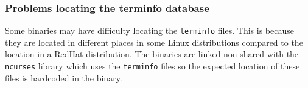 \documentclass[twoside,11pt]{article}
\renewcommand{\_}{\texttt{\symbol{95}}}
\begin{document}




\subsubsection{Problems locating the terminfo database}

Some binaries may have difficulty locating the \texttt{terminfo} files.
This is because they are located in different places in some Linux 
distributions compared to the location in a RedHat distribution.  The 
binaries are linked non-shared with the \texttt{ncurses} library which 
uses the \texttt{terminfo} files so the expected location of these files 
is hardcoded in the binary.
\end{document}
